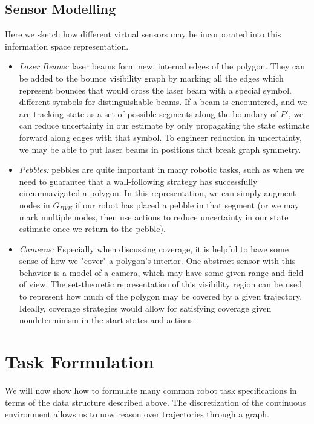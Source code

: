 \documentclass[]{styles/svproc}  %
\begin{document}
\subsection{Sensor Modelling}

Here we sketch how different virtual sensors may be incorporated into this
information space representation.

\begin{itemize}
\item \emph{Laser Beams:} laser beams form new, internal edges of the polygon. They can be
added to the bounce visibility graph by marking all the edges which represent
bounces that would cross the laser beam with a special symbol. different symbols
for distinguishable beams. If a beam is encountered, and we are tracking state
as a set of possible segments along the boundary of $P'$, we can reduce
uncertainty in our estimate by only propagating the state estimate
forward along edges with that symbol. To engineer reduction in uncertainty,
we may be able to put laser beams in positions that break graph symmetry.
\item \emph{Pebbles:} pebbles are quite important in many robotic tasks, such as
when we need to guarantee that a wall-following strategy has successfully
circumnavigated a polygon. In this representation, we can simply augment nodes
in $G_{BVE}$ if our robot has placed a pebble in that segment (or we may mark
multiple nodes, then use actions to reduce uncertainty in our state estimate
once we return to the pebble).
\item \emph{Cameras:} Especially when discussing coverage, it is helpful to have
some sense of how we "cover" a polygon's interior. One abstract sensor with this
behavior is a model of a camera, which may have some given range and field of
view. The set-theoretic representation of this visibility region can be used to
represent how much of the polygon may be covered by a given trajectory. Ideally,
coverage strategies would allow for satisfying coverage given nondeterminism in
the start states and actions.
\end{itemize}

\section{Task Formulation}

We will now show how to formulate many common robot task specifications in terms
of the data structure described above. The discretization of the continuous
environment allows us to now reason over trajectories through a graph.
\end{document}
